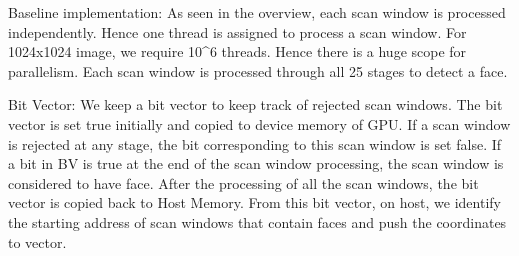 Baseline implementation:
As seen in the overview, each scan window is processed independently. Hence one thread is assigned 
to process a scan window. For 1024x1024 image, we require 10^6 threads. Hence there is a huge scope 
for parallelism. Each scan window is processed through all 25 stages to detect a face. 

Bit Vector:
We keep a bit vector to keep track of rejected scan windows. The bit vector is set true initially 
and copied to device memory  of GPU. If a scan window is rejected at any stage, the bit corresponding 
to this scan window is set false.  If a bit in BV is true at the end of the scan window processing, 
the scan window is considered to have face.  After the processing of all the scan windows, 
the bit vector is copied back to Host Memory. From this bit vector,  on host, we identify the
starting address of scan windows that contain faces and push the coordinates to vector. 


